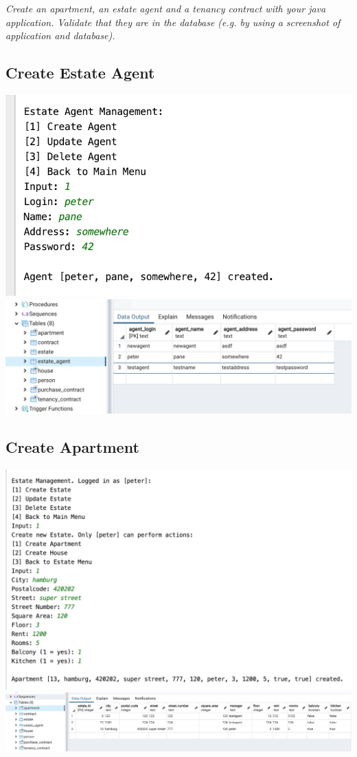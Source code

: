 \documentclass[ngerman]{dis-template-add}
\begin{document}
\textit{Create an apartment, an estate agent and a tenancy contract with your java application. Validate that they are in the database (e.g. by using a screenshot of application and database).}

\subsection*{Create Estate Agent}
\includegraphics[scale=.5]{agent_app} \\
\includegraphics[scale=.5]{agent_db}

\subsection*{Create Apartment}
\includegraphics[scale=.5]{estate_app} \\
\includegraphics[scale=.3]{estate_db}
\end{document}
